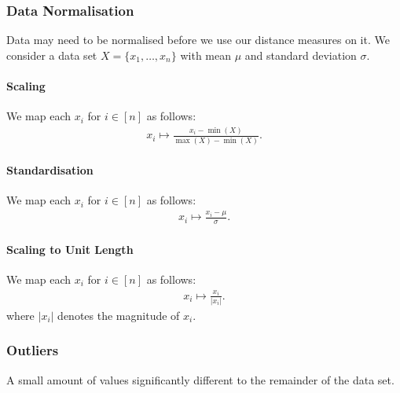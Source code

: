 \subsubsection{Data Normalisation}

Data may need to be normalised before we use our distance measures
on it. We consider a data set $X = \{x_1, \ldots, x_n\}$
with mean $\mu$ and standard deviation $\sigma$.

\paragraph{Scaling} We map each $x_i$ for $i \in [n]$ as follows:
\begin{gather*}
    x_i \mapsto \frac{x_i - \min(X)}{\max(X) - \min(X)}.
\end{gather*}

\paragraph{Standardisation} We map each $x_i$ for $i \in [n]$ as follows:
\begin{gather*}
    x_i \mapsto \frac{x_i - \mu}{\sigma}.
\end{gather*}

\paragraph{Scaling to Unit Length} We map each $x_i$ for $i \in [n]$ as follows:
\begin{gather*}
    x_i \mapsto \frac{x_i}{|x_i|}.
\end{gather*} where $|x_i|$ denotes the magnitude of $x_i$.

\subsubsection{Outliers}

A small amount of values significantly different to the remainder
of the data set.